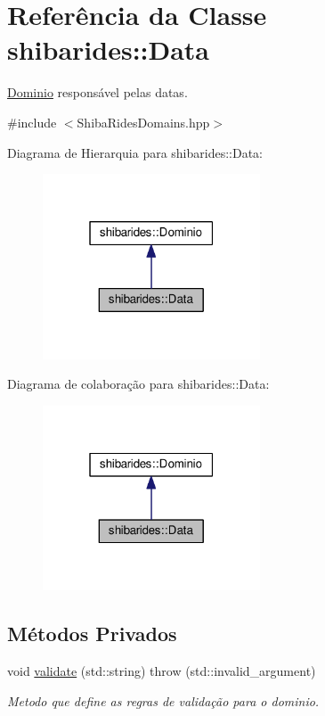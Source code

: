 \hypertarget{classshibarides_1_1Data}{}\section{Referência da Classe shibarides\+:\+:Data}
\label{classshibarides_1_1Data}


\hyperlink{classshibarides_1_1Dominio}{Dominio} responsável pelas datas.  




{\ttfamily \#include $<$Shiba\+Rides\+Domains.\+hpp$>$}



Diagrama de Hierarquia para shibarides\+:\+:Data\+:\nopagebreak
\begin{figure}[H]
\begin{center}
\leavevmode
\includegraphics[width=183pt]{classshibarides_1_1Data__inherit__graph}
\end{center}
\end{figure}


Diagrama de colaboração para shibarides\+:\+:Data\+:\nopagebreak
\begin{figure}[H]
\begin{center}
\leavevmode
\includegraphics[width=183pt]{classshibarides_1_1Data__coll__graph}
\end{center}
\end{figure}
\subsection*{Métodos Privados}
\begin{DoxyCompactItemize}
\item 
void \hyperlink{classshibarides_1_1Data_a6240717eb60d01a7ab0c12336685c862}{validate} (std\+::string)  throw (std\+::invalid\+\_\+argument)
\begin{DoxyCompactList}\small\item\em Metodo que define as regras de validação para o dominio. \end{DoxyCompactList}\end{DoxyCompactItemize}
